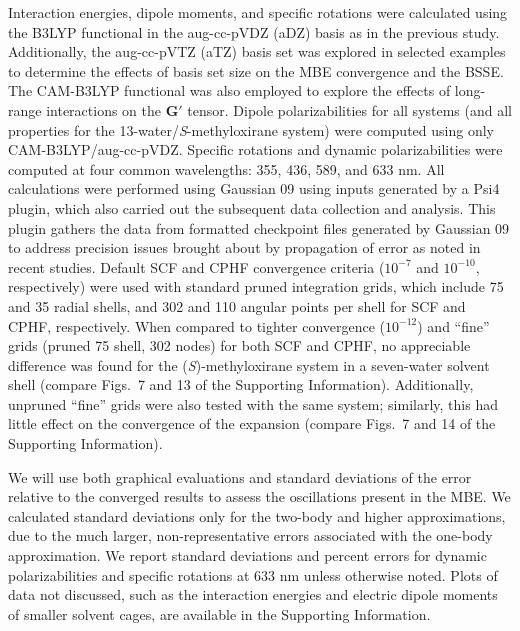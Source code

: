     Interaction energies, dipole moments, and specific rotations were calculated using the B3LYP\cite{Lee,Becke1993} functional in the aug-cc-pVDZ (aDZ) basis\cite{Dunning1989,Woon1994} as in the previous study. Additionally, the aug-cc-pVTZ (aTZ) basis set was explored in selected examples to determine the effects of basis set size on the MBE convergence and the BSSE. The CAM-B3LYP\cite{Yanai} functional was also employed to explore the effects of long-range interactions on the $\boldsymbol{G'}$ tensor. Dipole polarizabilities for all systems (and all properties for the 13-water/\textit{S}-methyloxirane system) were computed using only CAM-B3LYP/aug-cc-pVDZ. Specific rotations and dynamic polarizabilities were computed at four common wavelengths: 355, 436, 589, and 633 nm. All calculations were performed using Gaussian 09\cite{g16} using inputs generated by a Psi4\cite{Parrish2017} plugin, which also carried out the subsequent data collection and analysis. This plugin gathers the data from formatted checkpoint files generated by Gaussian 09 to address precision issues brought about by propagation of error as noted in recent studies.\cite{Richard2014,Liu2017a,Richard2018a} Default SCF and CPHF convergence criteria ($10^{-7}$ and $10^{-10}$, respectively) were used with standard pruned integration grids, which include 75 and 35 radial shells, and 302 and 110 angular points per shell for SCF and CPHF, respectively. When compared to tighter convergence ($10^{-12}$) and ``fine'' grids (pruned 75 shell, 302 nodes) for both SCF and CPHF, no appreciable difference was found for the (\textit{S})-methyloxirane system in a seven-water solvent shell (compare Figs.~7 and 13 of the Supporting Information). Additionally, unpruned ``fine'' grids were also tested with the same system; similarly, this had little effect on the convergence of the expansion (compare Figs.~7 and 14 of the Supporting Information). 

    We will use both graphical evaluations and standard deviations of the error relative to the converged results to assess the oscillations present in the MBE. We calculated standard deviations only for the two-body and higher approximations, due to the much larger, non-representative errors associated with the one-body approximation.
We report standard deviations and percent errors for dynamic polarizabilities and specific rotations at 633 nm unless otherwise noted. Plots of data not discussed, such as the interaction energies and electric dipole moments of smaller solvent cages, are available in the Supporting Information. 
